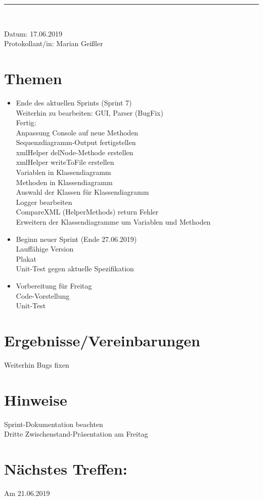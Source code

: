 \begin{center}  
\vspace{0.5pt}\nointerlineskip\rule{\textwidth}{0.2pt}\\ 
\vspace{0.5pt}\nointerlineskip
\end{center} 
\large Datum: 17.06.2019\vspace{3pt}\\\large Protokollant/in: Marian Geißler
\section*{Themen}
\begin{itemize}
\item Ende des aktuellen Sprints (Sprint 7)\\
Weiterhin zu bearbeiten: GUI, Parser (BugFix)\\
Fertig:\\
Anpassung Console auf neue Methoden\\
Sequenzdiagramm-Output fertigstellen\\
xmlHelper delNode-Methode erstellen\\
xmlHelper writeToFile erstellen\\
Variablen in Klassendiagramm\\
Methoden in Klassendiagramm\\
Auswahl der Klassen für Klassendiagramm\\
Logger bearbeiten\\
CompareXML (HelperMethods) return Fehler\\
Erweitern der Klassendiagramme um Variablen und Methoden\\
\item Beginn neuer Sprint (Ende 27.06.2019)\\
Lauffähige Version\\
Plakat\\
Unit-Test gegen aktuelle Spezifikation\\
\item Vorbereitung für Freitag\\
Code-Vorstellung\\
Unit-Test\\
\end{itemize}
\section*{Ergebnisse/Vereinbarungen}
Weiterhin Bugs fixen\\
\section*{Hinweise}
Sprint-Dokumentation beachten\\
Dritte Zwischenstand-Präsentation am Freitag\\
\section*{Nächstes Treffen:}
Am 21.06.2019\\